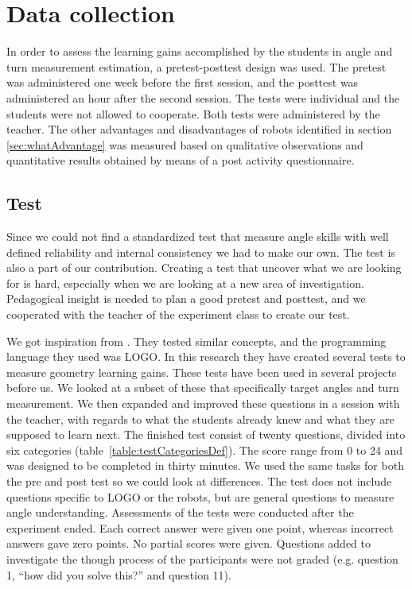 \section{Data collection}
In order to assess the learning gains accomplished by the students in angle and turn measurement estimation, a pretest-posttest design was used. The pretest was administered one week before the first session, and the posttest was administered an hour after the second session. The tests were individual and the students were not allowed to cooperate. Both tests were administered by the teacher. The other advantages and disadvantages of robots identified in section \ref{sec:whatAdvantage} was measured based on qualitative observations and quantitative results obtained by means of a post activity questionnaire.

\subsection*{Test}
Since we could not find a standardized test that measure angle skills with well defined reliability and internal consistency we had to make our own. The test is also a part of our contribution. Creating a test that uncover what we are looking for is hard, especially when we are looking at a new area of investigation. Pedagogical insight is needed to plan a good pretest and posttest, and we cooperated with the teacher of the experiment class to create our test.

\bigskip\noindent
We got inspiration from \citeauthor{clements2001logo}\cite{clements2001logo}. They tested similar concepts, and the programming language they used was LOGO. In this research they have created several tests to measure geometry learning gains. These tests have been used in several projects before us. We looked at a subset of these that specifically target angles and turn measurement. We then expanded and improved these questions in a session with the teacher, with regards to what the students already knew and what they are supposed to learn next. 
The finished test consist of twenty questions, divided into six categories (table~\ref{table:testCategoriesDef}). The score range from 0 to 24 and was designed to be completed in thirty minutes. We used the same tasks for both the pre and post test so we could look at differences. The test does not include questions specific to LOGO or the robots, but are general questions to measure angle understanding. 
Assessments of the tests were conducted after the experiment ended. Each correct answer were given one point, whereas incorrect answers gave zero points. No partial scores were given. Questions added to investigate the though process of the participants were not graded (e.g. question 1, "`how did you solve this?"' and question 11). 

